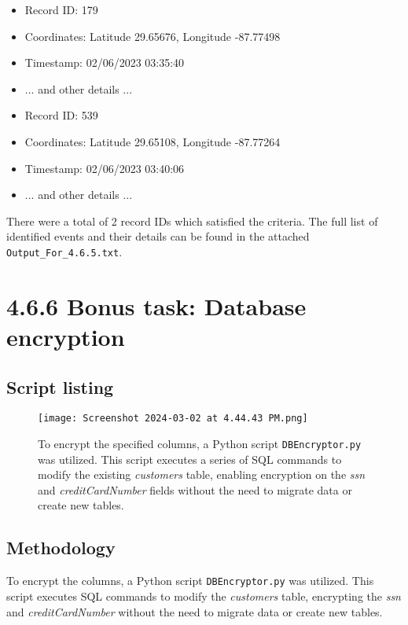 \documentclass{article}
\begin{document}
\begin{itemize}
    \item Record ID: 179
    \item Coordinates: Latitude 29.65676, Longitude -87.77498
    \item Timestamp: 02/06/2023 03:35:40
    \item ... and other details ...
\end{itemize}

\begin{itemize}
    \item Record ID: 539
    \item Coordinates: Latitude 29.65108, Longitude -87.77264
    \item Timestamp: 02/06/2023 03:40:06
    \item ... and other details ...
\end{itemize}

There were a total of 2 record IDs which satisfied the criteria. The full list of identified events and their details can be found in the attached \texttt{Output\_For\_4.6.5.txt}.

\section*{4.6.6 Bonus task: Database encryption}

\subsection*{Script listing}


\begin{figure}[H]
    \centering
    \texttt{[image: Screenshot 2024-03-02 at 4.44.43 PM.png]}
    \caption{To encrypt the specified columns, a Python script \texttt{DBEncryptor.py} was utilized. This script executes a series of SQL commands to modify the existing \textit{customers} table, enabling encryption on the \textit{ssn} and \textit{creditCardNumber} fields without the need to migrate data or create new tables.}
\end{figure}

%

\subsection*{Methodology}
To encrypt the columns, a Python script \texttt{DBEncryptor.py} was utilized. This script executes SQL commands to modify the \textit{customers} table, encrypting the \textit{ssn} and \textit{creditCardNumber} without the need to migrate data or create new tables.
\end{document}
